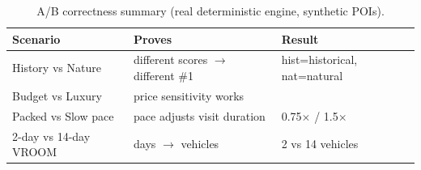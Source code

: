 \begin{table}[h]\centering\small
\caption{A/B correctness summary (real deterministic engine, synthetic POIs).}
\label{tab:ab}\begin{tabular}{lll}
\toprule Scenario & Proves & Result \\ \midrule
History vs Nature & different scores $\to$ different \#1 & hist=historical, nat=natural \\
Budget vs Luxury & price sensitivity works &  \\
Packed vs Slow pace & pace adjusts visit duration & 0.75$\times$ / 1.5$\times$ \\
2-day vs 14-day VROOM & days $\to$ vehicles & 2 vs 14 vehicles \\
\bottomrule\end{tabular}\end{table}
